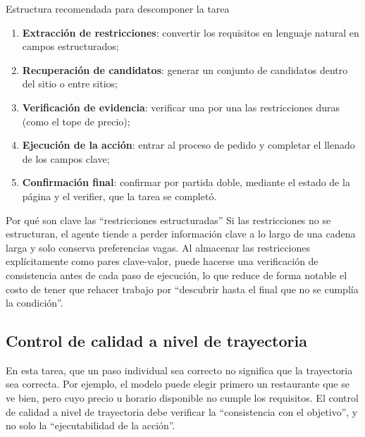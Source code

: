 \documentclass[a4paper]{article}
\begin{document}
\begin{importantbox}{Estructura recomendada para descomponer la tarea}
\begin{enumerate}
    \item \textbf{Extracción de restricciones}: convertir los requisitos en lenguaje natural en campos estructurados;
    \item \textbf{Recuperación de candidatos}: generar un conjunto de candidatos dentro del sitio o entre sitios;
    \item \textbf{Verificación de evidencia}: verificar una por una las restricciones duras (como el tope de precio);
    \item \textbf{Ejecución de la acción}: entrar al proceso de pedido y completar el llenado de los campos clave;
    \item \textbf{Confirmación final}: confirmar por partida doble, mediante el estado de la página y el verifier, que la tarea se completó.
\end{enumerate}
\end{importantbox}

\begin{knowledgebox}{Por qué son clave las ``restricciones estructuradas''}
Si las restricciones no se estructuran, el agente tiende a perder información clave a lo largo de una cadena larga y solo conserva preferencias vagas. Al almacenar las restricciones explícitamente como pares clave-valor, puede hacerse una verificación de consistencia antes de cada paso de ejecución, lo que reduce de forma notable el costo de tener que rehacer trabajo por ``descubrir hasta el final que no se cumplía la condición''.
\end{knowledgebox}

\subsection{Control de calidad a nivel de trayectoria}
En esta tarea, que un paso individual sea correcto no significa que la trayectoria sea correcta. Por ejemplo, el modelo puede elegir primero un restaurante que se ve bien, pero cuyo precio u horario disponible no cumple los requisitos. El control de calidad a nivel de trayectoria debe verificar la ``consistencia con el objetivo'', y no solo la ``ejecutabilidad de la acción''.
\end{document}
